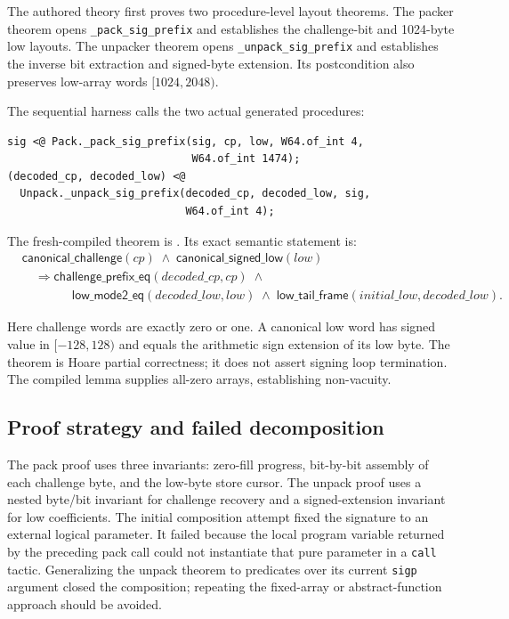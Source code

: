 The authored theory first proves two procedure-level layout theorems. The
packer theorem opens \texttt{\_pack\_sig\_prefix} and establishes the
challenge-bit and 1024-byte low layouts. The unpacker theorem opens
\texttt{\_unpack\_sig\_prefix} and establishes the inverse bit extraction and
signed-byte extension. Its postcondition also preserves low-array words
$[1024,2048)$.

The sequential harness calls the two actual generated procedures:
\begin{verbatim}
sig <@ Pack._pack_sig_prefix(sig, cp, low, W64.of_int 4,
                             W64.of_int 1474);
(decoded_cp, decoded_low) <@
  Unpack._unpack_sig_prefix(decoded_cp, decoded_low, sig,
                            W64.of_int 4);
\end{verbatim}

The fresh-compiled theorem is
. Its exact semantic
statement is:
\[
\begin{split}
 &\mathsf{canonical\_challenge}(cp)\;\land\;
   \mathsf{canonical\_signed\_low}(low)\\
 &\quad\Longrightarrow
   \mathsf{challenge\_prefix\_eq}(decoded\_cp,cp)\;\land\\
 &\qquad\qquad
   \mathsf{low\_mode2\_eq}(decoded\_low,low)\;\land\;
   \mathsf{low\_tail\_frame}(initial\_low,decoded\_low).
\end{split}
\]

Here challenge words are exactly zero or one. A canonical low word has signed
value in $[-128,128)$ and equals the arithmetic sign extension of its low
byte. The theorem is Hoare partial correctness; it does not assert signing
loop termination. The compiled
 lemma supplies all-zero
arrays, establishing non-vacuity.

\subsection*{Proof strategy and failed decomposition}

The pack proof uses three invariants: zero-fill progress, bit-by-bit assembly
of each challenge byte, and the low-byte store cursor. The unpack proof uses a
nested byte/bit invariant for challenge recovery and a signed-extension
invariant for low coefficients. The initial composition attempt fixed the
signature to an external logical parameter. It failed because the local
program variable returned by the preceding pack call could not instantiate
that pure parameter in a \texttt{call} tactic. Generalizing the unpack theorem
to predicates over its current \texttt{sigp} argument closed the composition;
repeating the fixed-array or abstract-function approach should be avoided.

